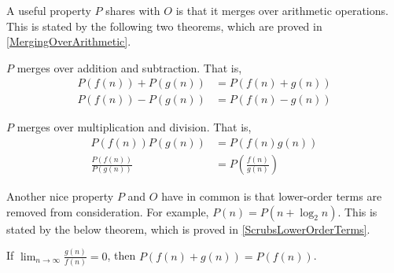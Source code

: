 A useful property $P$ shares with $O$ is that it merges over arithmetic operations. This is stated by the following two theorems, which are proved in \ref{MergingOverArithmetic}.

\begin{theorem}
	$P$ merges over addition and subtraction. That is,
	\begin{align*}
	P(f(n)) + P(g(n)) &= P(f(n) + g(n))\\
	P(f(n)) - P(g(n)) &= P(f(n) - g(n))
	\end{align*}
\end{theorem}

\begin{theorem}
	$P$ merges over multiplication and division. That is,
	\begin{align*}
	P(f(n))P(g(n)) &= P(f(n)g(n))\\
	\frac {P(f(n))} {P(g(n))} &= P\left(\frac{f(n)} {g(n)}\right)
	\end{align*}
\end{theorem}

Another nice property $P$ and $O$ have in common is that lower-order terms are removed from consideration. For example, $P(n) = P(n + \log_2 n)$. This is stated by the below theorem, which is proved in \ref{ScrubsLowerOrderTerms}.

\begin{theorem}
	If $\lim_{n \to \infty} \frac{g(n)}{f(n)} = 0$, then $P(f(n) + g(n)) = P(f(n))$.
\end{theorem}